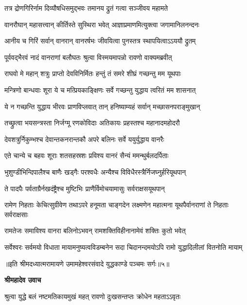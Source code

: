 \twolineshloka
{तत्र द्रोणगिरिर्नाम दिव्यौषधिसमुद्भवः}
{तमानय द्रुतं गत्वा सञ्जीवय महामते} %

\twolineshloka
{वानरौघान् महासत्त्वान् कीर्तिस्ते सुस्थिरा भवेत्}
{आज्ञाप्रमाणमित्युक्त्वा जगामानिलनन्दनः} %

\twolineshloka
{आनीय च गिरिं सर्वान् वानरान् वानरर्षभः}
{जीवयित्वा पुनस्तत्र स्थापयित्वाऽऽययौ द्रुतम्} %

\twolineshloka
{पूर्ववद्भैरवं नादं वानराणां बलौघतः}
{श्रुत्वा विस्मयमापन्नो रावणो वाक्यमब्रवीत्} %

\twolineshloka
{राघवो मे महान् शत्रुः प्राप्तो देवविनिर्मितः}
{हन्तुं तं समरे शीघ्रं गच्छन्तु मम यूथपाः} %

\twolineshloka
{मन्त्रिणो बान्धवाः शूरा ये च मत्प्रियकाङ्क्षिणः}
{सर्वे गच्छन्तु युद्धाय त्वरितं मम शासनात्} %

\twolineshloka
{ये न गच्छन्ति युद्धाय भीरवः प्राणविप्लवात्}
{तान् हनिष्याम्यहं सर्वान् मच्छासनपराङ्मुखान्} %

\twolineshloka
{तच्छ्रुत्वा भयसन्त्रस्ता निर्जग्मू रणकोविदाः}
{अतिकायः प्रहस्तश्च महानादमहोदरौ} %

\twolineshloka
{देवशत्रुर्निकुम्भश्च देवान्तकनरान्तकौ}
{अपरे बलिनः सर्वे ययुर्युद्धाय वानरैः} %

\twolineshloka
{एते चान्ये च बहवः शूराः शतसहस्रशः}
{प्रविश्य वानरं सैन्यं ममन्थुर्बलदर्पिताः} %

\twolineshloka
{भुशुण्डीभिन्दिपालैश्च बाणैः खड्गैः परश्वधैः}
{अन्यैश्च विविधैरस्त्रैर्निजघ्नुर्हरियूथपान्} %

\twolineshloka
{ते पादपैः पर्वताग्रैर्नखदंष्ट्रैश्च मुष्टिभिः}
{प्राणैर्विमोचयामासुः सर्वराक्षसयूथपान्} %

\threelineshloka
{रामेण निहताः केचित्सुग्रीवेण तथाऽपरे}
{हनूमता चाङ्गदेन लक्ष्मणेन महात्मना}
{यूथपैर्वानराणां ते निहताः सर्वराक्षसाः} %

\twolineshloka
{रामतेजः समाविश्य वानरा बलिनोऽभवन्}
{रामशक्तिविहीनानामेवं शक्तिः कुतो भवेत्} %

\fourlineindentedshloka
{सर्वेश्वरः सर्वमयो विधाता}
{मायामनुष्यत्वविडम्बनेन}
{सदा चिदानन्दमयोऽपि रामो}
{युद्धादिलीलां वितनोति मायाम्} %

{॥इति श्रीमदध्यात्मरामायणे उमामहेश्वरसंवादे युद्धकाण्डे
पञ्चमः सर्गः॥५॥
}




\textbf{श्रीमहादेव उवाच}

\twolineshloka
{श्रुत्वा युद्धे बलं नष्टमतिकायमुखं महत्}
{रावणो दुःखसन्तप्तः क्रोधेन महताऽऽवृतः} %

